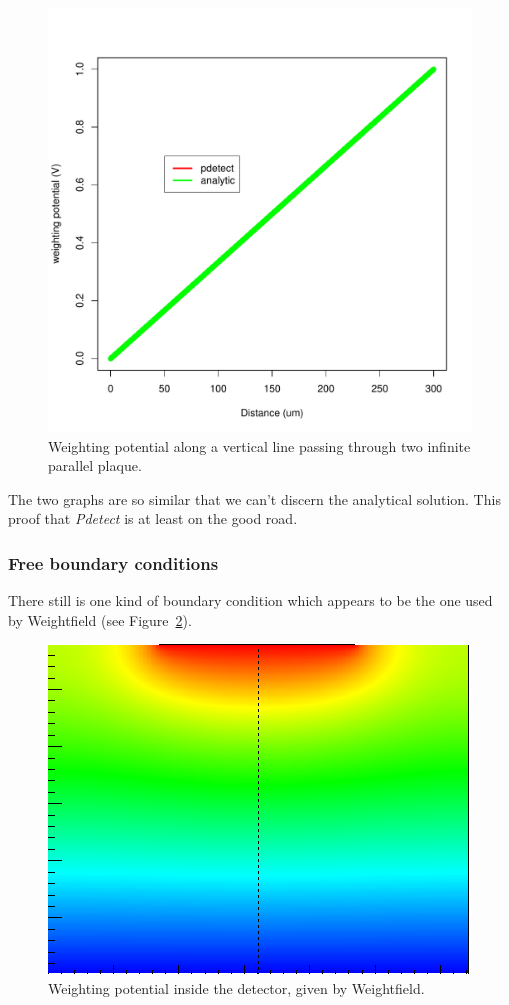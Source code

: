 \documentclass[11pt]{article}
\begin{document}
			\begin{figure}[H]
				\center
				\includegraphics[scale=0.45]{images/boundary_conditions/parallel.pdf}
				\caption{Weighting potential along a vertical line passing through two infinite parallel plaque.}
				\label{fig:parallel}
			\end{figure}

			The two graphs are so similar that we can't discern the analytical solution. This proof that
			\textit{Pdetect} is at least on the good road.

		\subsubsection{Free boundary conditions}

			There still is one kind of boundary condition which appears to be the one used by Weightfield
			(see Figure~\ref{fig:weight_free}).

			\begin{figure}[H]
				\center
				\includegraphics[scale=0.45]{images/boundary_conditions/weight_free.png}
				\caption{Weighting potential inside the detector, given by Weightfield.}
				\label{fig:weight_free}
			\end{figure}
\end{document}
